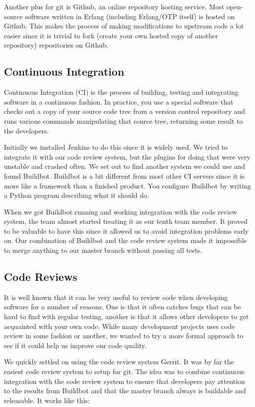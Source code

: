 \documentclass[11pt,a4paper]{report}
\begin{document}
Another plus for git is Github, an online repository hosting service. Most
open-source software written in Erlang (including Erlang/OTP itself) is hosted
on Github. This makes the process of making modifications to upstream code a lot
easier since it is trivial to fork (create your own hosted copy of another
repository) repositories on Github.
\subsection{Continuous Integration}
Continuous Integration (CI) is the process of building, testing and integrating
software in a continuous fashion. In practice, you use a special software that
checks out a copy of your source code tree from a version control repository and
runs various commands manipulating that source tree, returning some result to
the developers.

Initially we installed Jenkins to do this since it is widely used. We tried to
integrate it with our code review system, but the plugins for doing that were
very unstable and crashed often. We set out to find another system we could use
and found Buildbot. Buildbot is a bit different from most other CI servers since
it is more like a framework than a finished product. You configure Buildbot by
writing a Python program describing what it should do.

When we got Buildbot running and working integration with the code review
system, the team almost started treating it as our tenth team member. It proved
to be valuable to have this since it allowed us to avoid integration problems
early on. Our combination of Buildbot and the code review system made it
impossible to merge anything to our master branch without passing all tests.
\subsection{Code Reviews}
It is well known that it can be very useful to review code when developing
software for a number of reasons. One is that it often catches bugs that can be
hard to find with regular testing, another is that it allows other developers to
get acquainted with your own code. While many development projects uses code
review in some fashion or another, we wanted to try a more formal approach to
see if it could help us improve our code quality.

We quickly settled on using the code review system Gerrit. It was by far the
easiest code review system to setup for git. The idea was to combine continuous
integration with the code review system to ensure that developers pay attention
to the results from Buildbot and that the master branch always is buildable and
releasable. It works like this:
\end{document}

